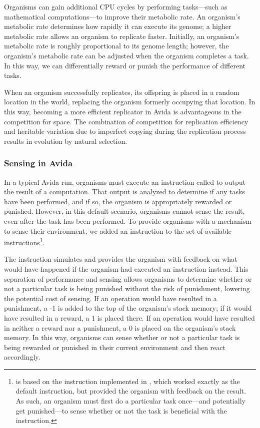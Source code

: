 Organisms can gain additional CPU cycles by performing tasks---such as mathematical computations---to improve their metabolic rate. 
An organism's metabolic rate determines how rapidly it can execute its genome; a higher metabolic rate allows an organism to replicate faster. 
Initially, an organism's metabolic rate is roughly proportional to its genome length; however, the organism's metabolic rate can be adjusted when the organism completes a task. 
In this way, we can differentially reward or punish the performance of different tasks.

When an organism successfully replicates, its offspring is placed in a random location in the world, replacing the organism formerly occupying that location. 
In this way, becoming a more efficient replicator in Avida is advantageous in the competition for space. 
The combination of competition for replication efficiency and heritable variation due to imperfect copying during the replication process results in evolution by natural selection. 

\subsubsection{Sensing in Avida}
\label{chapter:origins-of-plasticity:sec:methods:avida:sensing}

In a typical Avida run, organisms must execute an instruction called  to output the result of a computation. 
That output is analyzed to determine if any tasks have been performed, and if so, the organism is appropriately rewarded or punished. 
However, in this default scenario, organisms cannot sense the result, even after the task has been performed. 
To provide organisms with a mechanism to sense their environment, we added an  instruction to the set of available instructions\footnote{
 is based on the  instruction implemented in \citep{clune_investigating_2007}, which worked exactly as the default  instruction, but provided the organism with feedback on the result.
As such, an organism must first do a particular task once---and potentially get punished---to sense whether or not the task is beneficial with the  instruction.
}.

The  instruction simulates  and provides the organism with feedback on what would have happened if the organism had executed an  instruction instead. 
This separation of  performance and sensing allows organisms to determine whether or not a particular task is being punished without the risk of punishment, lowering the potential cost of sensing. 
If an  operation would have resulted in a punishment, a -1 is added to the top of the organism's stack memory; if it would have resulted in a reward, a 1 is placed there. 
If an  operation would have resulted in neither a reward nor a punishment, a 0 is placed on the organism's stack memory. 
In this way, organisms can sense whether or not a particular task is being rewarded or punished in their current environment and then react accordingly.  

